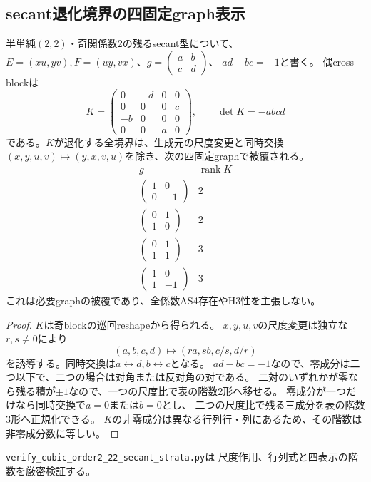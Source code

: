 \subsection{secant退化境界の四固定graph表示}
\label{subsec:h3-order2-22-secant-strata}
\begin{proposition}\label{prop:h3-order2-22-secant-degenerate-strata}
半単純$(2,2)$・奇関係数2の残るsecant型について、
$E=(xu,yv),F=(uy,vx)$、$g=\left(\begin{smallmatrix}a&b\\c&d\end{smallmatrix}\right)$、
$ad-bc=-1$と書く。
偶cross blockは
\[
 K=\begin{pmatrix}0&-d&0&0\\0&0&0&c\\-b&0&0&0\\0&0&a&0\end{pmatrix},
 \qquad\det K=-abcd
\]
である。$K$が退化する全境界は、生成元の尺度変更と同時交換
$(x,y,u,v)\mapsto(y,x,v,u)$を除き、次の四固定graphで被覆される。
\[
\begin{array}{c|c}
 g&\operatorname{rank}K\\\hline
 \begin{pmatrix}1&0\\0&-1\end{pmatrix}&2\\[2pt]
 \begin{pmatrix}0&1\\1&0\end{pmatrix}&2\\[2pt]
 \begin{pmatrix}0&1\\1&1\end{pmatrix}&3\\[2pt]
 \begin{pmatrix}1&0\\1&-1\end{pmatrix}&3
\end{array}
\]
これは必要graphの被覆であり、全係数AS4存在やH3性を主張しない。
\end{proposition}
\begin{proof}
$K$は奇blockの巡回reshapeから得られる。
$x,y,u,v$の尺度変更は独立な$r,s\ne0$により
\[
 (a,b,c,d)\longmapsto(ra,sb,c/s,d/r)
\]
を誘導する。同時交換は$a\leftrightarrow d,b\leftrightarrow c$となる。
$ad-bc=-1$なので、零成分は二つ以下で、二つの場合は対角または反対角の対である。
二対のいずれかが零なら残る積が$\pm1$なので、一つの尺度比で表の階数2形へ移せる。
零成分が一つだけなら同時交換で$a=0$または$b=0$とし、
二つの尺度比で残る三成分を表の階数3形へ正規化できる。
$K$の非零成分は異なる行列行・列にあるため、その階数は非零成分数に等しい。
\end{proof}
\texttt{verify\_cubic\_order2\_22\_secant\_strata.py}は
尺度作用、行列式と四表示の階数を厳密検証する。

